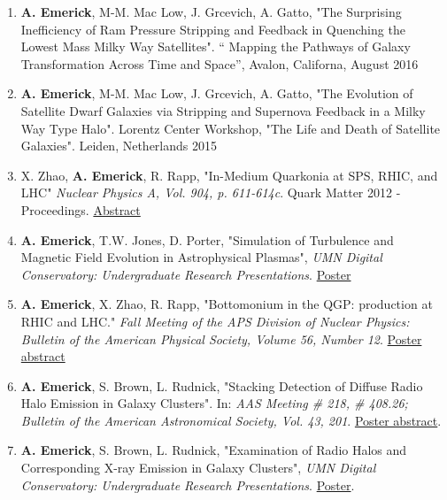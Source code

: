 \documentclass[10pt]{article}
\makeatletter
\newlength{\bibhang}
\newlength{\bibsep}
 {\@listi \global\bibsep\itemsep \global\advance\bibsep by\parsep}
\newenvironment{bibsection}%
        {\begin{enumerate}{}{%
       \setlength{\leftmargin}{\bibhang}%
       \setlength{\itemindent}{-\leftmargin}%
       \setlength{\itemsep}{\bibsep}%
       \setlength{\parsep}{\z@}%
        \setlength{\partopsep}{0pt}%
        \setlength{\topsep}{0pt}}}
        {\end{enumerate}\vspace{-.6\baselineskip}}
\makeatother
\begin{document}
\begin{bibsection}
  \item \textbf{A. Emerick}, M-M. Mac Low, J. Grcevich, A. Gatto, "The Surprising Inefficiency of Ram Pressure Stripping and Feedback in Quenching the Lowest Mass Milky Way Satellites". 
 `` Mapping the Pathways of Galaxy Transformation Across Time and Space'', Avalon, Californa,
    August 2016
  
  \item \textbf{A. Emerick}, M-M. Mac Low, J. Grcevich, A. Gatto, "The Evolution of Satellite
  Dwarf Galaxies via Stripping and Supernova Feedback in a Milky Way Type Halo". 
  Lorentz Center Workshop, "The Life and Death of Satellite Galaxies". Leiden, Netherlands 2015

	\item X. Zhao, \textbf{A. Emerick}, R. Rapp, "In-Medium Quarkonia at SPS, RHIC, and LHC"
	\textit{Nuclear Physics A, Vol. 904, p. 611-614c}. Quark Matter 2012 - Proceedings. 
	\href{http://www.sciencedirect.com/science/article/pii/S0375947413002042}{Abstract}
	
	\item \textbf{A. Emerick}, T.W. Jones, D. Porter, "Simulation of Turbulence and Magnetic
	Field Evolution in Astrophysical Plasmas", \textit{UMN Digital Conservatory:
	Undergraduate Research Presentations}. \href{http://purl.umn.edu/123023}{Poster}

	\item \textbf{A. Emerick}, X. Zhao, R. Rapp, "Bottomonium in the QGP: production at
	RHIC and LHC." \textit{Fall Meeting of the APS Division of Nuclear Physics: Bulletin
	of the American Physical Society, Volume 56, Number 12}.
	\href{http://meeting.aps.org/Meeting/DNP11/Event/156070}{Poster abstract}

	\item \textbf{A. Emerick}, 	S. Brown, L. Rudnick, "Stacking Detection of Diffuse Radio
	Halo Emission in Galaxy Clusters". In: \textit{AAS Meeting \# 218, \# 408.26; Bulletin of 
	the American Astronomical Society, Vol. 43, 201}. 
	\href{http://adsabs.harvard.edu/abs/2011AAS...21840826E}{Poster abstract}.
	
	\item \textbf{A. Emerick}, S. Brown, L. Rudnick, "Examination of Radio Halos and 
	Corresponding X-ray Emission in Galaxy Clusters", \textit{UMN Digital Conservatory:
	Undergraduate Research Presentations}.
	\href{http://conservancy.umn.edu/handle/104933}{Poster}.
\end{bibsection}
\end{document}
